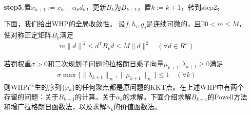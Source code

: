             \textbf{step5.}置$x_{k+ 1}:=x_k+{\alpha}_kd_k$，更新$B_k$为$B_{k+1}$，置$k:=k+1$，转到step2。
            \par
            下面，我们给出WHP的全局收敛性。
            设$f,h_i,g_j$是连续可微的，且$\exists 0<m \leqslant M$，使对称正定矩阵$B_k$满足
            \begin{align*}
             m {\|d\|}^2\leqslant d^\mathrm{T} B_kd \leqslant M\|d\|^2\quad (\forall d \in R^n)
            \end{align*}
            \par
            若罚权重$\sigma > 0$和二次规划子问题的拉格朗日乘子向量${\mu}_{k+1},{\lambda}_{k+1} \geqslant 0$满足
            \begin{align*}
             \sigma \max \{\|{\lambda}_{k+1}\|_{\infty},\|{\mu}_{k+1}\|_{\infty}\}\leqslant 1 \quad (\forall k)
            \end{align*}
            则WHP产生的序列$\{x_k\}$的任何聚点都是原问题的KKT点。在上述WHP中有两个存留的问题：关于$B_{k+1}$的计算。关于${\alpha}_k$的求解。下面介绍求解$B_{k+1}$的Powell方法和增广拉格朗日函数法，以及求解$\alpha_k$的价值函数法。
